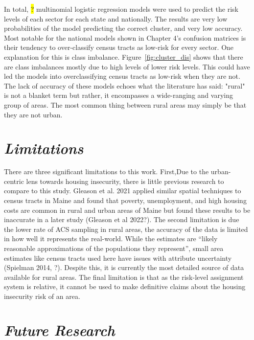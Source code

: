 In total, \hl{?} multinomial logistic regression models were used to predict the risk levels of each sector for each state and nationally. The results are very low probabilities of the model predicting the correct cluster, and very low accuracy. Most notable for the national models shown in Chapter 4's confusion matrices is their tendency to over-classify census tracts as low-risk for every sector. One explanation for this is class imbalance. Figure~\ref{fig:cluster_dis} shows that there are class imbalances mostly due to high levels of lower risk levels. This could have led the models into overclassifying census tracts as low-risk when they are not. The lack of accuracy of these models echoes what the literature has said: "rural" is not a blanket term but rather, it encompasses a wide-ranging and varying group of areas. The most common thing between rural areas may simply be that they are not urban. 

\section{\textit{Limitations}}

There are three significant limitations to this work. First,Due to the urban-centric lens towards housing insecurity, there is little previous research to compare to this study. Gleason et al. 2021 applied similar spatial techniques to census tracts in Maine and found that poverty, unemployment, and high housing costs are common in rural and urban areas of Maine but found these results to be inaccurate in a later study (Gleason et al 2022?). The second limitation is due the lower rate of ACS sampling in rural areas, the accuracy of the data is limited in how well it represents the real-world. While the estimates are “likely reasonable approximations of the populations they represent”, small area estimates like census tracts used here have issues with attribute uncertainty (Spielman 2014, ?). Despite this, it is currently the most detailed source of data available for rural areas. The final limitation is that as the risk-level assignment system is relative, it cannot be used to make definitive claims about the housing insecurity risk of an area.  

\section{\textit{Future Research}}


